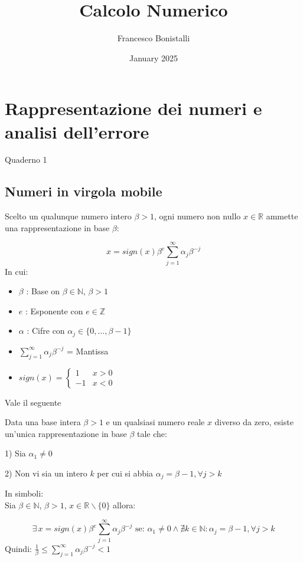 \documentclass[12pt,a4paper,]{report}
\title{Calcolo Numerico}
\author{Francesco Bonistalli}
\date{January 2025}
\begin{document}
\maketitle

\tableofcontents


\chapter{Rappresentazione dei numeri e analisi dell'errore}
Quaderno 1

\begin{lezione}
    [Lezione 1]
\end{lezione}

\section{Numeri in virgola mobile}

Scelto un qualunque numero intero $\beta > 1$, ogni numero non nullo $x \in \mathbb{R}$ ammette una rappresentazione in base $\beta$:

\[
x = sign(x)\beta^e \sum_{j=1}^{\infty} \alpha_j\beta^{-j}
\]
\noindent
In cui:
\begin{itemize}
  \item $\beta$ : Base on $\beta \in \mathbb{N}$, $\beta > 1$
  \item $e$ : Esponente con $e \in \mathbb{Z}$
  \item $\alpha$ : Cifre con $\alpha_j \in \{0,\ldots,\beta - 1\}$
  \item $\displaystyle\sum_{j=1}^{\infty} \alpha_j\beta^{-j}$ = Mantissa
  \item $sign(x) = \begin{cases} 1 & x > 0 \\ -1 & x < 0 \end{cases}$
\end{itemize}
Vale il seguente

\begin{teorema}
    Data una base intera $\beta > 1$ e un qualsiasi numero reale $x$ diverso da zero, esiste un'unica rappresentazione in base $\beta$ tale che:
    
    1) Sia $\alpha_1 \neq 0$
    
    2) Non vi sia un intero $k$ per cui si abbia $\alpha_j = \beta - 1, \forall j > k$
    
    \noindent
    In simboli:\\
    Sia $\beta \in \mathbb{N}$, $\beta > 1$, $x \in \mathbb{R}\backslash\{0\}$ allora:
    
    \[
    \exists\, x = sign(x)\beta^e \sum_{j=1}^{\infty} \alpha_j\beta^{-j}
    \text{ se: } \alpha_1 \neq 0 \wedge \nexists k \in \mathbb{N} : \alpha_j = \beta - 1, \forall j > k
    \]
    \noindent
    Quindi: $\displaystyle\frac{1}{\beta} \leq \sum_{j=1}^{\infty} \alpha_j\beta^{-j} < 1$
        
\end{teorema}
\end{document}
